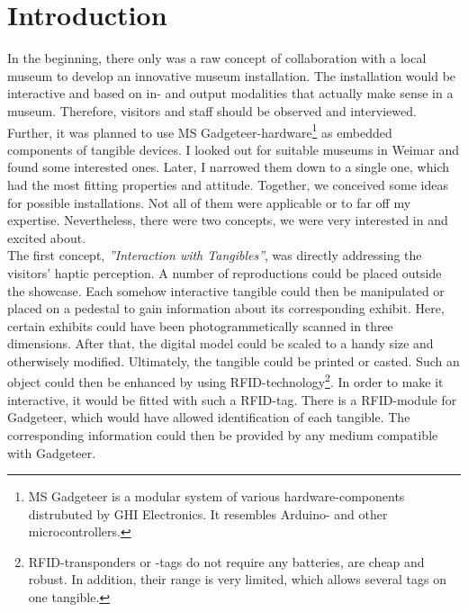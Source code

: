\chapter{Introduction}
\label{introduction}

In the beginning, there only was a raw concept of collaboration with a local museum to develop an innovative museum installation. The installation would be interactive and based on in- and output modalities that actually make sense in a museum. Therefore, visitors and staff should be observed and interviewed. Further, it was planned to use \ac{MS} Gadgeteer-hardware\footnote{\ac{MS} Gadgeteer is a modular system of various hardware-components distrubuted by GHI Electronics. It resembles Arduino- and other microcontrollers.} as embedded components of tangible devices.
I looked out for suitable museums in Weimar and found some interested ones. Later, I narrowed them down to a single one, which had the most fitting properties and attitude. Together, we conceived some ideas for possible installations. Not all of them were applicable or to far off my expertise. Nevertheless, there were two concepts, we were very interested in and excited about.
\\
The first concept, \textit{''Interaction with Tangibles''}, was directly addressing the visitors' haptic perception. A number of reproductions could be placed outside the showcase. Each somehow interactive tangible could then be manipulated or placed on a pedestal to gain information about its corresponding exhibit. Here, certain exhibits could have been photogrammetically scanned in three dimensions. After that, the digital model could be scaled to a handy size and otherwisely modified. Ultimately, the tangible could be printed or casted. Such an object could then be enhanced by using \ac{RFID}-technology\footnote{RFID-transponders or -tags do not require any batteries, are cheap and robust. In addition, their range is very limited, which allows several tags on one tangible.}. In order to make it interactive, it would be fitted with such a \ac{RFID}-tag. There is a \ac{RFID}-module for Gadgeteer, which would have allowed identification of each tangible. The corresponding information could then be provided by any medium compatible with Gadgeteer.
